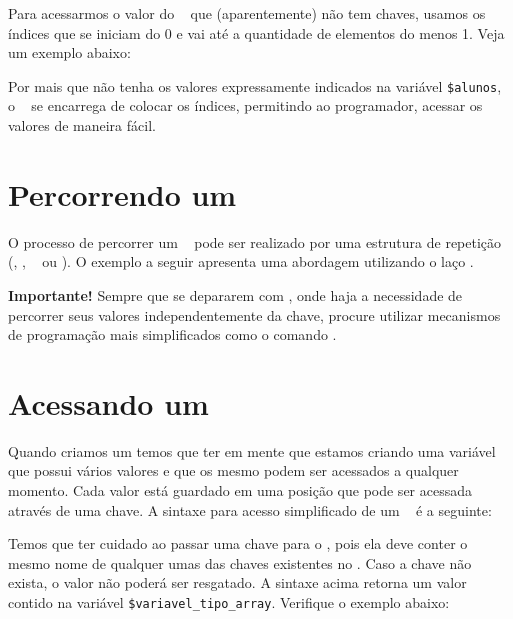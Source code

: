 Para acessarmos o valor do \tipoarray~ que (aparentemente) não tem chaves, usamos
os índices que se iniciam do 0 e vai até a quantidade de elementos do \tipoarray menos 1.
Veja um exemplo abaixo:



Por mais que não tenha os valores expressamente indicados na variável \texttt{\$alunos},
o \php~ se encarrega de colocar os índices, permitindo ao programador, acessar os valores
de maneira fácil.

\section{Percorrendo um \tipoarray}
\label{percorrendo-um-array}

O processo de percorrer um \tipoarray~ pode ser realizado por uma estrutura de 
repetição (\comandofor, \comandowhile, \comandodowhile~ ou \comandoforeach). O exemplo a 
seguir apresenta uma abordagem utilizando o laço \comandoforeach.



\begin{framed}
\textbf{{\Large Importante!}}
Sempre que se depararem com \tipoarrays, onde haja a necessidade de percorrer 
seus valores independentemente da chave, procure utilizar mecanismos de 
programação mais simplificados como o comando \comandoforeach.
\end{framed}

\section{Acessando um \tipoarray}
\label{acessando-um-array}

Quando criamos um \tipoarray temos que ter em mente que estamos criando uma variável 
que possui vários valores e que os mesmo podem ser acessados a qualquer momento. 
Cada valor está guardado em uma posição que pode ser acessada através de uma chave.
A sintaxe para acesso simplificado de um \tipoarray~ é a seguinte:


Temos que ter cuidado ao passar uma chave para o \tipoarray, pois ela deve conter o 
mesmo nome de qualquer umas das chaves existentes no \tipoarray. Caso a chave não exista, 
o valor não poderá ser resgatado. A sintaxe acima retorna um valor contido na variável 
\texttt{\$variavel\_tipo\_array}. Verifique o exemplo abaixo: 

